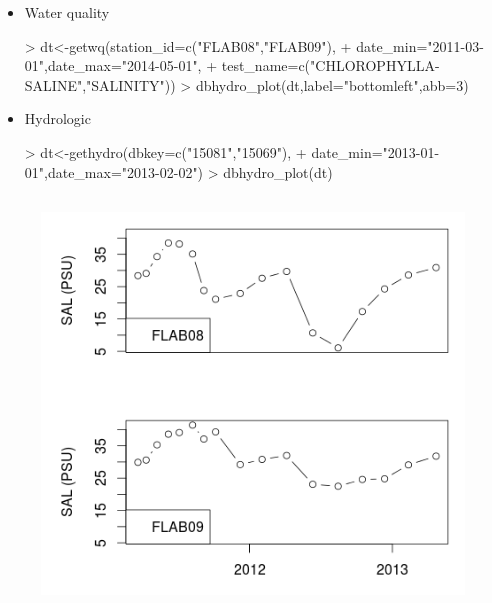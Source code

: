 \documentclass[12pt,notitlepage]{article}
\begin{document}
\begin{itemize}

\item{Water quality}
\begin{Schunk}
\begin{Sinput}
> dt<-getwq(station_id=c("FLAB08","FLAB09"),
+                 date_min="2011-03-01",date_max="2014-05-01",
+                 test_name=c("CHLOROPHYLLA-SALINE","SALINITY"))
> dbhydro_plot(dt,label="bottomleft",abb=3)
\end{Sinput}
\end{Schunk}


\item{Hydrologic}
\begin{Schunk}
\begin{Sinput}
> dt<-gethydro(dbkey=c("15081","15069"),
+              date_min="2013-01-01",date_max="2013-02-02")
> dbhydro_plot(dt)
\end{Sinput}
\end{Schunk}
\end{itemize}

\vspace{2pt}
\begin{figure}[H]
\begin{center}
\includegraphics[width=343.5pt,height=310.8pt]{Rplot}
\end{center}
\label{fig:zero}
\end{figure}
\end{document}
